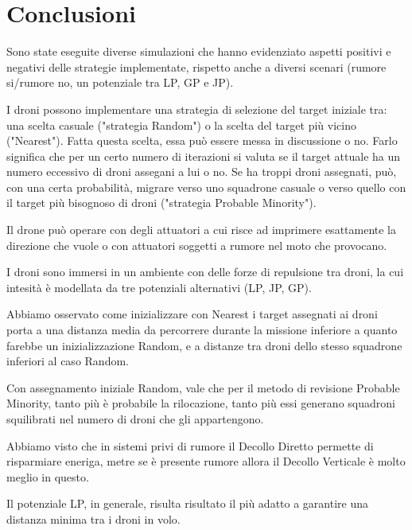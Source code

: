 \documentclass[a4paper,11pt,oneside, table]{article}
\begin{document}
\section{Conclusioni}

Sono state eseguite diverse simulazioni che hanno evidenziato aspetti positivi e negativi delle strategie implementate, rispetto anche a diversi scenari (rumore si/rumore no, un potenziale tra LP, GP e JP).

I droni possono implementare una strategia di selezione del target iniziale tra: una scelta casuale ("strategia Random") o la scelta del target pi\`u vicino ("Nearest"). Fatta questa scelta, essa pu\`o essere messa in discussione o no. Farlo significa che per un certo numero di iterazioni si valuta se il target attuale ha un numero eccessivo di droni assegani a lui o no. Se ha troppi droni assegnati,  pu\`o, con una certa probabilit\`a, migrare verso uno squadrone casuale o verso quello con il target pi\`u bisognoso di droni ("strategia Probable Minority").

Il drone pu\`o operare con degli attuatori a cui risce ad imprimere esattamente la direzione che vuole o con attuatori soggetti a rumore nel moto che provocano.

I droni sono immersi in un ambiente con delle forze di repulsione tra droni, la cui intesit\`a \`e modellata da tre potenziali alternativi (LP, JP, GP).

Abbiamo osservato come inizializzare con Nearest i target assegnati ai droni porta a una distanza media da percorrere durante la missione inferiore a quanto farebbe un inizializzazione Random, e a distanze tra droni dello stesso squadrone inferiori al caso Random.

Con assegnamento iniziale Random, vale che per il metodo di revisione Probable Minority, tanto pi\`u \`e probabile la rilocazione, tanto pi\`u essi generano squadroni squilibrati nel numero di droni che gli appartengono.

Abbiamo visto che in sistemi privi di rumore il Decollo Diretto permette di risparmiare eneriga, metre se \`e presente rumore allora il Decollo Verticale \`e molto meglio in questo.

Il potenziale LP, in generale, risulta risultato il pi\`u adatto a garantire una distanza minima tra i droni in volo.

\printbibliography[title={Bibliografia}]
\end{document}
